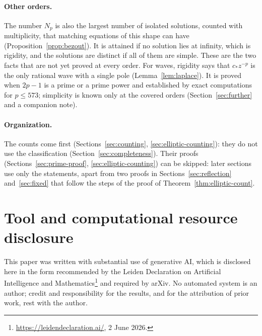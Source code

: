 \documentclass[11pt]{article}
\theoremstyle{definition}
\theoremstyle{remark}
\numberwithin{equation}{section}
\begin{document}
\paragraph{Other orders.}
The number \(N_p\) is also the largest number of isolated solutions,
counted with multiplicity, that matching equations of this shape can
have (Proposition~\ref{prop:bezout}). It is attained if no solution lies
at infinity, which is rigidity, and the solutions are distinct if all of
them are simple. These are the two facts that are not yet proved at
every order. For waves, rigidity says that \(c_\ast z^{-p}\) is the only
rational wave with a single pole (Lemma~\ref{lem:laplace}). It is proved
when \(2p-1\) is a prime or a prime power and established by exact
computations for \(p\le573\); simplicity is known only at the covered
orders (Section~\ref{sec:further} and a companion note).

\paragraph{Organization.}
The counts come first (Sections~\ref{sec:counting},
\ref{sec:elliptic-counting}): they do not use the classification
(Section~\ref{sec:completeness}). Their proofs
(Sections~\ref{sec:prime-proof}, \ref{sec:elliptic-counting}) can be
skipped: later sections use only the statements, apart from two proofs
in Sections~\ref{sec:reflection} and~\ref{sec:fixed} that follow the
steps of the proof of Theorem~\ref{thm:elliptic-count}.









\appendix


\section*{Tool and computational resource disclosure}

This paper was written with substantial use of generative AI, which is
disclosed here in the form recommended by the Leiden Declaration on
Artificial Intelligence and
Mathematics\footnote{\url{https://leidendeclaration.ai/}, 2 June 2026.}
and required by arXiv.
No automated system is an author; credit and responsibility for the
results, and for the attribution of prior work, rest with the author.
\end{document}
